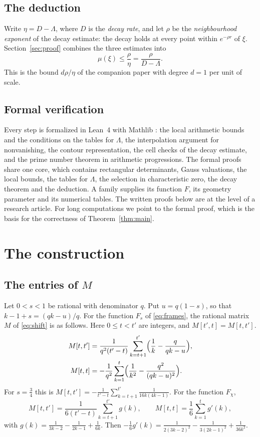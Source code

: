 \documentclass[11pt]{amsart}
\theoremstyle{definition}
\theoremstyle{remark}
\numberwithin{equation}{section}
\begin{document}
\subsection{The deduction}
Write $\eta=D-\Lambda$, where $D$ is the \emph{decay rate}, and let $\rho$ be the \emph{neighbourhood exponent} of the
decay estimate: the decay holds at every point within $e^{-\rho r}$ of $\xi$. Section~\ref{sec:proof} combines the
three estimates into
\[
 \mu(\xi)\le\frac\rho\eta=\frac\rho{D-\Lambda}.
\]
This is the bound $d\rho/\eta$ of the companion paper \cite{Litsey2026} with degree $d=1$ per unit of scale.

\subsection{Formal verification}
Every step is formalized in Lean~4 with Mathlib \cite{Lean4,Mathlib}: the local arithmetic bounds and the conditions on
the tables for $\Lambda$, the interpolation argument for nonvanishing, the contour representation, the cell checks of
the decay estimate, and the prime number theorem in arithmetic progressions. The formal proofs share one core, which
contains rectangular determinants, Gauss valuations, the local bounds, the tables for $\Lambda$, the selection in
characteristic zero, the decay theorem and the deduction. A family supplies its function $F$, its geometry parameter and
its numerical tables. The written proofs below are at the level of a research article. For long computations we point
to the formal proof, which is the basis for the correctness of Theorem~\ref{thm:main}.

\section{The construction}\label{sec:construction}

\subsection{The entries of $M$}
Let $0<s<1$ be rational with denominator $q$. Put $u=q(1-s)$, so that $k-1+s=(qk-u)/q$. For the function $F_s$ of
\eqref{eq:frames}, the rational matrix $M$ of \eqref{eq:shift} is as follows. Here $0\le t<t'$ are integers, and
$M[t',t]=M[t,t']$.
\begin{align*}
 M[t,t']&=\frac1{q^2(t'-t)}\sum_{k=t+1}^{t'}\Bigl(\frac1k-\frac q{qk-u}\Bigr),\\
 M[t,t]&=-\frac1{q^2}\sum_{k=1}^{t}\Bigl(\frac1{k^2}-\frac{q^2}{(qk-u)^2}\Bigr).
\end{align*}
For $s=\frac34$ this is $M[t,t']=-\frac1{t'-t}\sum_{k=t+1}^{t'}\frac1{16k(4k-1)}$. For the function $F_\chi$,
\[
 M[t,t']=\frac1{6(t'-t)}\sum_{k=t+1}^{t'}g(k),\qquad M[t,t]=\frac16\sum_{k=1}^{t}g'(k),
\]
with $g(k)=\frac1{3k-2}-\frac1{2k-1}+\frac1{6k}$. Then
$-\frac16g'(k)=\frac1{2(3k-2)^2}-\frac1{3(2k-1)^2}+\frac1{36k^2}$.
\end{document}
